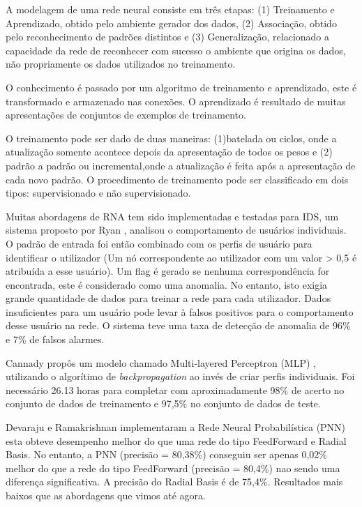 \documentclass[
	12pt,				%
	openright,			%
	oneside,
	a4paper,			%
	english,			%
	french,				%
	spanish,			%
	brazil				%
	]{abntex2}
\begin{document}
A modelagem de uma rede neural consiste em três etapas: (1) Treinamento e Aprendizado, obtido pelo ambiente gerador dos dados, (2) Associação, obtido pelo reconhecimento de padrões distintos e (3) Generalização, relacionado a capacidade da rede de reconhecer com sucesso o ambiente que origina os dados, não propriamente os dados utilizados no treinamento.

O conhecimento é passado por um algoritmo de treinamento e aprendizado, este é transformado e armazenado nas conexões. 
O aprendizado é resultado de muitas apresentações de conjuntos de exemplos de treinamento.

O treinamento pode ser dado de duas maneiras: (1)batelada ou ciclos, onde a atualização somente acontece depois da apresentação de todos os pesos e (2) padrão a padrão ou incremental,onde a atualização é feita após a apresentação de cada novo padrão. O procedimento de treinamento pode ser classificado em dois tipos: supervisionado e não supervisionado.

Muitas abordagens de RNA tem sido implementadas e testadas para IDS, um sistema proposto por Ryan \cite{Ryan}, analisou  o comportamento de usuários individuais. O padrão de entrada foi então combinado com os perfis de usuário para identificar o utilizador (Um nó correspondente ao utilizador com um valor > 0,5 é atribuída a esse usuário). Um flag é gerado se nenhuma correspondência for encontrada,  este é considerado como uma anomalia. No entanto, isto exigia grande quantidade de dados para treinar a rede para cada utilizador. Dados insuficientes para um usuário pode levar à falsos positivos para o comportamento desse usuário na rede. O sistema teve uma taxa de detecção de anomalia de 96\% e 7\% de falsos alarmes.

Cannady propôs um modelo chamado Multi-layered Perceptron (MLP) \cite{Cannady}, utilizando o algorítimo de \textit{backpropagation} ao invés de criar perfis individuais. Foi necessário 26.13 horas para completar com aproximadamente 98\% de acerto no conjunto de dados de treinamento e 97,5\% no conjunto de dados de teste.

Devaraju e Ramakrishnan implementaram a  Rede Neural Probabilística (PNN) \cite{Devaraju} esta obteve desempenho melhor do que uma rede do tipo FeedForward e Radial Basis. No entanto, a PNN (precisão = 80,38\%) conseguiu ser apenas 0,02\% melhor do que a rede do tipo FeedForward (precisão = 80,4\%) nao sendo uma diferença significativa. A precisão do  Radial Basis é de 75,4\%.
Resultados mais baixos que as abordagens que vimos até agora.
\end{document}
